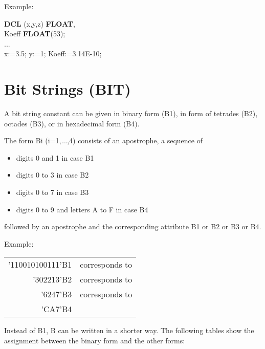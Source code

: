 Example:

{\bf DCL} (x,y,z) {\bf FLOAT},\\
\x Koeff {\bf FLOAT}(53);\\
... \\
x:=3.5; y:=1; Koeff:=3.14E-10;

\section{Bit Strings (BIT)}  %
\label{sec_bit_strings}

A bit string constant can be given in binary form (B1), in form of
tetrades (B2), octades (B3), or in hexadecimal form (B4).

The form Bi (i=1,...,4) consists of an apostrophe, a sequence of
\begin{itemize}
\item digits 0 and 1 in case B1
\item digits 0 to 3 in case B2
\item digits 0 to 7 in case B3
\item digits 0 to 9 and letters A to F in case B4
\end{itemize}
followed by an apostrophe and the corresponding attribute B1 or B2 or
B3 or B4.

Example:

\begin{tabular}{rl}
'110010100111'B1 & corresponds to\\
      '302213'B2 & corresponds to\\
        '6247'B3 & corresponds to\\
         'CA7'B4 & \\
\end{tabular}

Instead of B1, B can be written in a shorter way. The following tables
show the assignment between the binary form and the other forms:

